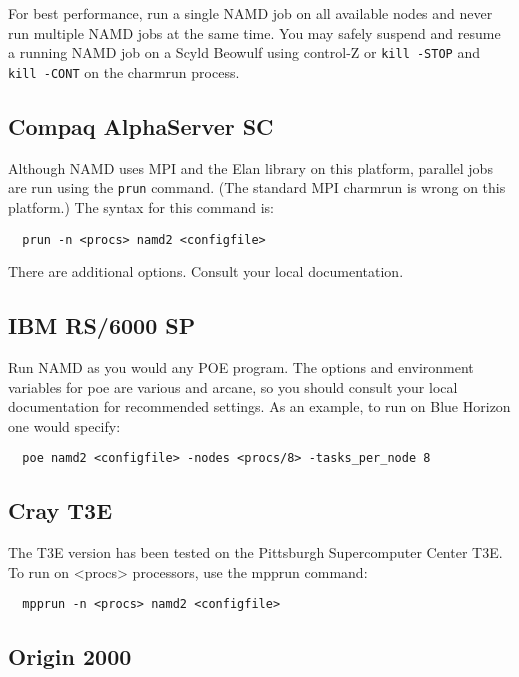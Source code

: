 For best performance, run a single NAMD job on all available nodes and
never run multiple NAMD jobs at the same time.  You may safely suspend
and resume a running NAMD job on a Scyld Beowulf using control-Z or
\verb#kill -STOP# and \verb#kill -CONT# on the charmrun process.

\subsection{Compaq AlphaServer SC}

Although NAMD uses MPI and the Elan library on this platform, parallel
jobs are run using the \verb#prun# command.  (The standard MPI charmrun is
wrong on this platform.)  The syntax for this command is:

\begin{verbatim}
  prun -n <procs> namd2 <configfile>
\end{verbatim}

There are additional options.  Consult your local documentation.

\subsection{IBM RS/6000 SP}

Run NAMD as you would any POE program.  The options and environment
variables for poe are various and arcane, so you should consult your
local documentation for recommended settings.  As an example, to run
on Blue Horizon one would specify:

\begin{verbatim}
  poe namd2 <configfile> -nodes <procs/8> -tasks_per_node 8
\end{verbatim}

\subsection{Cray T3E}

The T3E version has been tested on the Pittsburgh Supercomputer Center
T3E.  To run on <procs> processors, use the mpprun command:

\begin{verbatim}
  mpprun -n <procs> namd2 <configfile>
\end{verbatim}

\subsection{Origin 2000}

